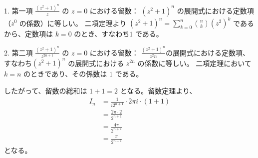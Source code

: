 \documentclass[platex,dvipdfmx,a4paper]{jsarticle}
\begin{document}
  1. 第一項 $\frac{(z^2 + 1)^n}{z}$ の $z=0$ における留数：
  $(z^2 + 1)^n$ の展開式における定数項（$z^0$ の係数）に等しい。
  二項定理より $(z^2 + 1)^n = \sum_{k=0}^n \binom{n}{k} (z^2)^k$ であるから、定数項は $k=0$ のとき、すなわち$1$ である。

  2. 第二項 $\frac{(z^2 + 1)^n}{z^{2n+1}}$ の $z=0$ における留数：
  $\frac{(z^2 + 1)^n}{z^2n}$の展開式における定数項、すなわち$(z^2 + 1)^n$ の展開式における $z^{2n}$ の係数に等しい。
  二項定理において $k=n$ のときであり、その係数は $1$ である。

  したがって、留数の総和は $1 + 1 = 2$ となる。留数定理より、
  \begin{align*}
  I_n &= \frac{1}{i 2^{n+1}} \cdot 2\pi i \cdot (1 + 1) \\
  &= \frac{2\pi \cdot 2}{2^{n+1}} \\
  &= \frac{4\pi}{2^{n+1}} \\
  &= \frac{\pi}{2^{n-1}}
  \end{align*}
  となる。
\end{document}
